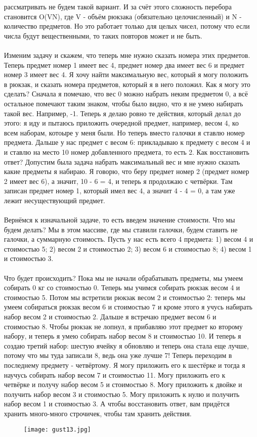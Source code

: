 \documentclass[a4paper,12pt]{article}
\begin{document}
рассматривать не будем такой вариант. И за счёт этого сложность перебора становится O(VN), где V - объём рюкзака (обязательно целочисленный) и N - количество предметов. Но это работает только для целых чисел, потому что если числа будут вещественными, то таких повторов может и не быть. \\
\\
Изменим задачу и скажем, что теперь мне нужно сказать номера этих предметов. Теперь предмет номер 1 имеет вес 4, предмет номер два имеет вес 6 и предмет номер 3 имеет вес 4. Я хочу найти максимальную вес, который я могу положить в рюкзак, и сказать номера предметов, который я в него положил. Как я могу это сделать? Сначала я помечаю, что вес 0 можно набрать неким предметом 0, а всё остальное помечают таким знаком, чтобы было видно, что я не умею набирать такой вес. Например, -1. Теперь я делаю ровно те действия, который делал до этого: я иду и пытаюсь приложить очередной предмет, например, весом 4, ко всем наборам, котоыре у меня были. Но теперь вместо галочки я ставлю номер предмета. Дальше у нас предмет с весом 6: прикладываю к предмету с весом 4 и и ставлю на место 10 номер добавленного предмета, то есть 2. Как восстановить ответ? Допустим была задача набрать максимальный вес и мне нужно сказать какие предметы я набираю. Я говорю, что беру предмет номер 2 (предмет номер 2 имеет вес 6), а значит, 10 - 6 = 4, и теперь я продолжаю с четвёрки. Там записан предмет номер 1, который имел вес 4, а значит 4 - 4 = 0, а там уже лежит несуществующий предмет.\\
\\
Вернёмся к изначальной задаче, то есть введем значение стоимости. Что мы будем делать? Мы в этом массиве, где мы ставили галочки, будем ставить не галочки, а суммарную стоимость. Пусть у нас есть всего 4 предмета: 1) весом 4 и стоимостью 5; 2) весом 2 и стоимостью 2; 3) весом 6 и стоимостью 8; 4) весом 1 и стоимостью 3. 
\\ \\Что будет происходить? Пока мы не начали обрабатывать предметы, мы умеем собирать 0 кг со стоимостью 0. Теперь мы учимся собирать рюкзак весом 4 и стоимостью 5. Потом мы встретили рюкзак весом 2 и стоимостью 2: теперь мы умеем собираться рюкзак весом 6 и стоимостью 7 и кроме этого я учусь набирать набор весом 2 и стоимостью 2. Дальше я встречаю предмет весом 6 и стоимостью 8. Чтобы рюкзак не лопнул, я прибавляю этот предмет ко второму набору, и теперь я умею собирать набор весом 8 и стоимостью 10. И теперь я создаю третий набор: шестую ячейку я обновляю и теперь она стала еще лучше, потому что мы туда записали 8, ведь она уже лучше 7! Теперь переходим в последнему предмету - четвёртому. Я могу приложить его к шестёрке и тогда я научусь собирать набор весом 7 и стоимостью 11. Могу приложить его к четвёрке и получу набор весом 5 и стоимостью 8. Могу приложить к двойке и получить набор весом 3 и стоимостью 5. Могу приложить к нулю и получить набор весом 1 и стоимостью 3. А чтобы восстановить ответ, вам придётся хранить много-много строчичек, чтобы там хранить действия. 
\begin{figure}[h]
\centering
\texttt{[image: gust13.jpg]}
\end{figure}
\end{document}
